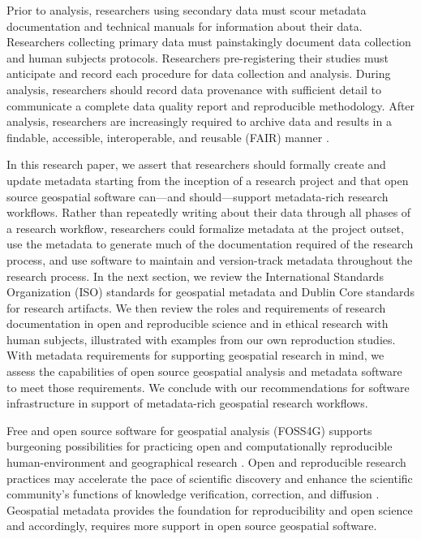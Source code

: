 \documentclass{isprs} %
\begin{document}
Prior to analysis, researchers using secondary data must scour metadata documentation and technical manuals for information about their data.
Researchers collecting primary data must painstakingly document data collection and human subjects protocols.
Researchers pre-registering their studies must anticipate and record each procedure for data collection and analysis. During analysis, researchers should record data provenance with sufficient detail to communicate a complete data quality report and reproducible methodology.
After analysis, researchers are increasingly required to archive data and results in a findable, accessible, interoperable, and reusable (FAIR) manner \citep{Wilkinson2016}.

In this research paper, we assert that researchers should formally create and update metadata starting from the inception of a research project and that open source geospatial software can---and should---support metadata-rich research workflows.
Rather than repeatedly writing about their data through all phases of a research workflow, researchers could formalize metadata at the project outset, use the metadata to generate much of the documentation required of the research process, and use software to maintain and version-track metadata throughout the research process.
In the next section, we review the International Standards Organization (ISO) standards for geospatial metadata and Dublin Core standards for research artifacts. We then review the roles and requirements of research documentation in open and reproducible science and in ethical research with human subjects, illustrated with examples from our own reproduction studies.
With metadata requirements for supporting geospatial research in mind, we assess the capabilities of open source geospatial analysis and metadata software to meet those requirements. We conclude with our recommendations for software infrastructure in support of metadata-rich geospatial research workflows.

Free and open source software for geospatial analysis (FOSS4G) supports burgeoning possibilities for practicing open and computationally reproducible human-environment and geographical research \citet{Singleton2016}.
Open and reproducible research practices may accelerate the pace of scientific discovery and enhance the scientific community's functions of knowledge verification, correction, and diffusion \citep{Rey2009,Kedron2022}.
Geospatial metadata provides the foundation for reproducibility and open science and accordingly, requires more support in open source geospatial software.
\end{document}
